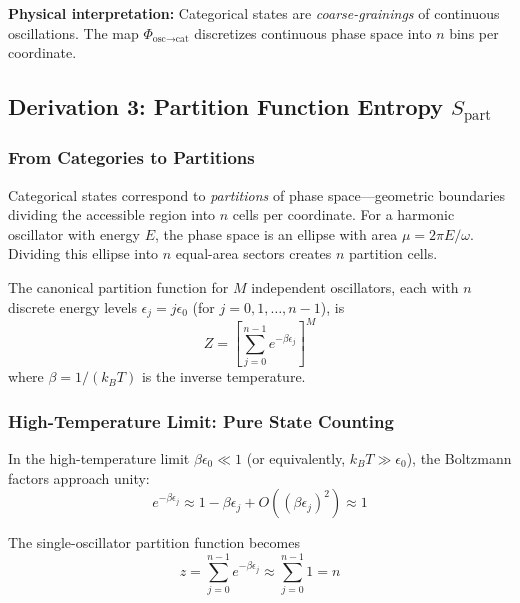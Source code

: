 \documentclass[twocolumn,10pt]{article}
\theoremstyle{remark}
\begin{document}
\textbf{Physical interpretation:} Categorical states are \textit{coarse-grainings} of continuous oscillations. The map $\Phi_{\text{osc} \to \text{cat}}$ discretizes continuous phase space into $n$ bins per coordinate.

\subsection{Derivation 3: Partition Function Entropy $S_{\text{part}}$}

\subsubsection{From Categories to Partitions}

Categorical states correspond to \textit{partitions} of phase space—geometric boundaries dividing the accessible region into $n$ cells per coordinate. For a harmonic oscillator with energy $E$, the phase space is an ellipse with area $\mu = 2\pi E/\omega$. Dividing this ellipse into $n$ equal-area sectors creates $n$ partition cells.

The canonical partition function for $M$ independent oscillators, each with $n$ discrete energy levels $\epsilon_j = j\epsilon_0$ (for $j = 0, 1, \ldots, n-1$), is
\begin{equation}
    Z = \left[\sum_{j=0}^{n-1} e^{-\beta \epsilon_j}\right]^M
    \label{eq:partition_function_discrete}
\end{equation}
where $\beta = 1/(k_B T)$ is the inverse temperature.

\subsubsection{High-Temperature Limit: Pure State Counting}

In the high-temperature limit $\beta \epsilon_0 \ll 1$ (or equivalently, $k_B T \gg \epsilon_0$), the Boltzmann factors approach unity:
\begin{equation}
    e^{-\beta \epsilon_j} \approx 1 - \beta \epsilon_j + O((\beta \epsilon_j)^2) \approx 1
    \label{eq:high_temp_expansion}
\end{equation}

The single-oscillator partition function becomes
\begin{equation}
    z = \sum_{j=0}^{n-1} e^{-\beta \epsilon_j} \approx \sum_{j=0}^{n-1} 1 = n
    \label{eq:z_high_temp}
\end{equation}
\end{document}
